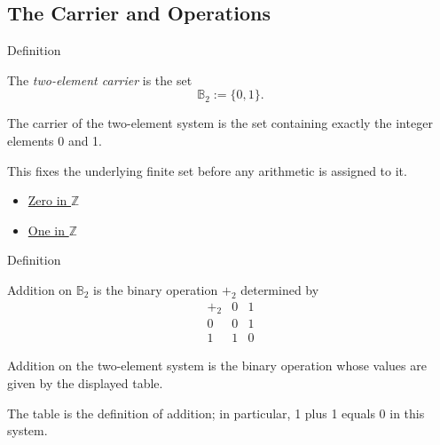 \subsection*{The Carrier and Operations}

\begin{definitionbox}{Definition}
\begin{definition}
\label{def:two-element-carrier}
The \emph{two-element carrier} is the set
\[
\mathbb{B}_2:=\{0,1\}.
\]
\end{definition}

\begin{remark*}
The carrier of the two-element system is the set containing exactly the integer elements 0 and 1.
\end{remark*}

\begin{remark*}[Interpretation]
This fixes the underlying finite set before any arithmetic is assigned to it.
\end{remark*}
\end{definitionbox}

\begin{dependencies}
\begin{itemize}
  \item \hyperref[def:zero-in-z]{Zero in \(\mathbb{Z}\)}
  \item \hyperref[def:one-in-z]{One in \(\mathbb{Z}\)}
\end{itemize}
\end{dependencies}

\begin{definitionbox}{Definition}
\begin{definition}
\label{def:addition-on-two-element-system}
Addition on \(\mathbb{B}_2\) is the binary operation \(+_2\) determined by
\[
\begin{array}{c|cc}
+_2 & 0 & 1\\ \hline
0 & 0 & 1\\
1 & 1 & 0
\end{array}
\]
\end{definition}

\begin{remark*}
Addition on the two-element system is the binary operation whose values are given by the displayed table.
\end{remark*}

\begin{remark*}[Interpretation]
The table is the definition of addition; in particular, 1 plus 1 equals 0 in this system.
\end{remark*}
\end{definitionbox}

